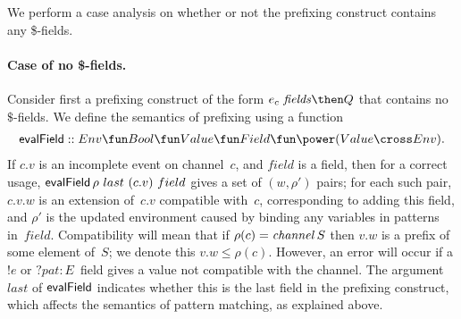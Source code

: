   We perform a case analysis on whether or not the prefixing construct
  contains any \$-fields.


\paragraph{Case of no \$-fields.} 

Consider first a prefixing construct of the form ${e_c~{\it fields} \then Q}$
that contains no $\$$-fields.  We define the semantics of prefixing using a
function
\[
  \evalField :: 
    \begin{align}
    Env \fun Bool \fun Value \fun Field \fun  \power (Value \cross Env).
    \end{align}
\]
If $c.v$ is an incomplete event on channel~$c$, and $field$ is a field, then
for a correct usage, $\mathop{\sf evalField} \rho~last~(c.v)~field$ gives a set of
$(w,\rho')$ pairs; for each such pair, $c.v.w$ is an extension of~$c.v$
compatible with~$c$, corresponding to adding this field, and $\rho'$ is the
updated environment caused by binding any variables in patterns in~$field$.
Compatibility will mean that if $\rho(c) = \mathop{\it channel} S$ then $v.w$ is a prefix
of some element of~$S$; we denote this $v.w \le \rho(c)$.  However, an error
will occur if a $!e$ or $?pat:E$~field gives a value not compatible with the
channel.  The argument~$last$ of $\mathop{\sf evalField}$ indicates whether this is the
last field in the prefixing construct, which affects the semantics of pattern
matching, as explained above.


